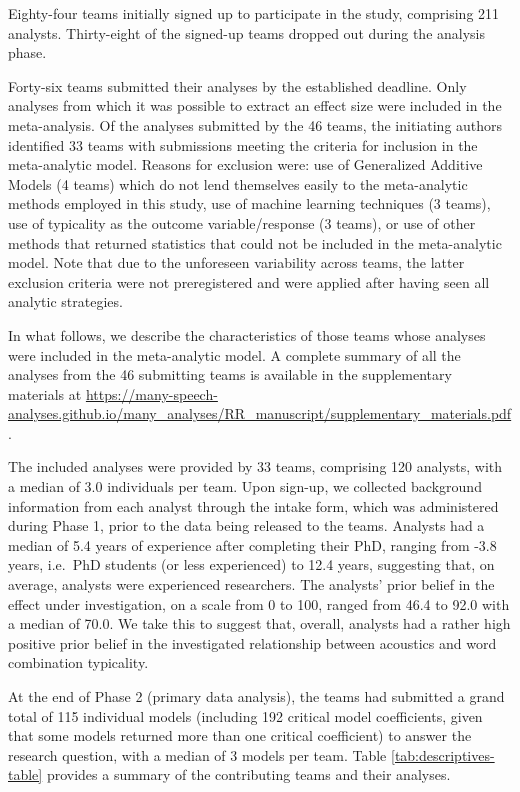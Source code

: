 \documentclass[Review,times,sageh]{sagej}
\begin{document}
Eighty-four teams initially signed up to participate in the study, comprising 211 analysts.
Thirty-eight of the signed-up teams dropped out during the analysis phase.

Forty-six teams submitted their analyses by the established deadline.
Only analyses from which it was possible to extract an effect size were included in the meta-analysis.
Of the analyses submitted by the 46 teams, the initiating authors identified 33 teams with submissions meeting the criteria for inclusion in the meta-analytic model.
Reasons for exclusion were: use of Generalized Additive Models (4 teams) which do not lend themselves easily to the meta-analytic methods employed in this study, use of machine learning techniques (3 teams), use of typicality as the outcome variable/response (3 teams), or use of other methods that returned statistics that could not be included in the meta-analytic model.
Note that due to the unforeseen variability across teams, the latter exclusion criteria were not preregistered and were applied after having seen all analytic strategies.

In what follows, we describe the characteristics of those teams whose analyses were included in the meta-analytic model.
A complete summary of all the analyses from the 46 submitting teams is available in the supplementary materials at \url{https://many-speech-analyses.github.io/many_analyses/RR_manuscript/supplementary_materials.pdf}.

The included analyses were provided by 33 teams, comprising 120 analysts, with a median of 3.0 individuals per team.
Upon sign-up, we collected background information from each analyst through the intake form, which was administered during Phase 1, prior to the data being released to the teams.
Analysts had a median of 5.4 years of experience after completing their PhD, ranging from -3.8 years, i.e.~PhD students (or less experienced) to 12.4 years, suggesting that, on average, analysts were experienced researchers.
The analysts' prior belief in the effect under investigation, on a scale from 0 to 100, ranged from 46.4 to 92.0 with a median of 70.0.
We take this to suggest that, overall, analysts had a rather high positive prior belief in the investigated relationship between acoustics and word combination typicality.

At the end of Phase 2 (primary data analysis), the teams had submitted a grand total of 115 individual models (including 192 critical model coefficients, given that some models returned more than one critical coefficient) to answer the research question, with a median of 3 models per team.
Table \ref{tab:descriptives-table} provides a summary of the contributing teams and their analyses.
\end{document}
